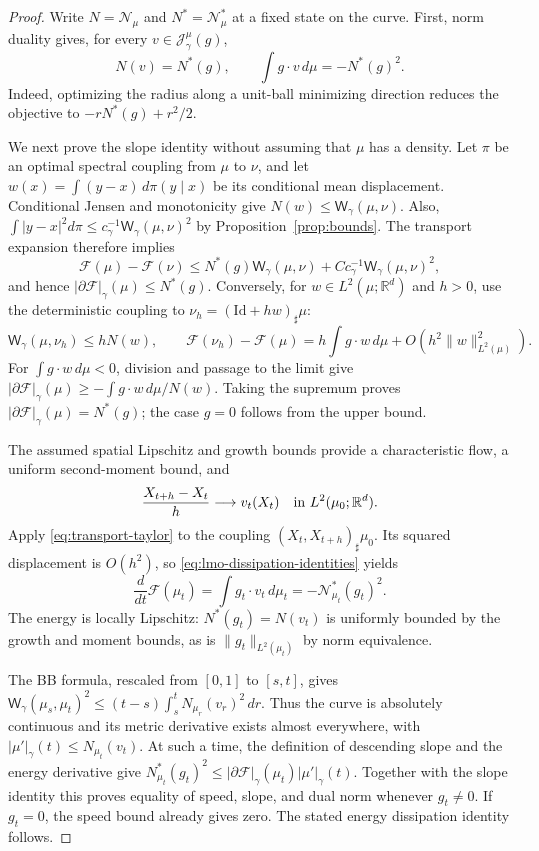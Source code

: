 \documentclass{article}
\newcommand{\R}{\mathbb{R}}
\newcommand{\MF}{\mathcal{F}}
\newcommand{\MN}{\mathcal{N}}
\newcommand{\MJ}{\mathcal{J}}
\newcommand{\Wg}{\mathsf{W}_{\gamma}}
\newcommand{\Id}{\mathrm{Id}}
\begin{document}
\begin{proof}
Write $N=\MN_\mu$ and $N^*=\MN_\mu^*$ at a fixed state on the curve.
First, norm duality gives, for every $v\in\MJ_\gamma^\mu(g)$,
\begin{equation}\label{eq:lmo-dissipation-identities}
 N(v)=N^*(g),\qquad \int g\cdot v\,d\mu=-N^*(g)^2.
\end{equation}
Indeed, optimizing the radius along a unit-ball minimizing direction reduces
the objective to $-rN^*(g)+r^2/2$.

We next prove the slope identity without assuming that $\mu$ has a density.
Let $\pi$ be an optimal spectral coupling from $\mu$ to $\nu$, and let
$w(x)=\int(y-x)\,d\pi(y\mid x)$ be its conditional mean displacement.
Conditional Jensen and monotonicity give
$N(w)\le\Wg(\mu,\nu)$. Also,
$\int|y-x|^2d\pi\le c_\gamma^{-1}\Wg(\mu,\nu)^2$ by
Proposition~\ref{prop:bounds}. The transport expansion therefore implies
\[
 \MF(\mu)-\MF(\nu)
 \le N^*(g)\Wg(\mu,\nu)+C c_\gamma^{-1}\Wg(\mu,\nu)^2,
\]
and hence $|\partial\MF|_\gamma(\mu)\le N^*(g)$.
Conversely, for $w\in L^2(\mu;\R^d)$ and $h>0$, use the deterministic
coupling to $\nu_h=(\Id+hw)_\sharp\mu$:
\[
 \Wg(\mu,\nu_h)\le hN(w),\qquad
 \MF(\nu_h)-\MF(\mu)=h\int g\cdot w\,d\mu+O(h^2\|w\|_{L^2(\mu)}^2).
\]
For $\int g\cdot w\,d\mu<0$, division and passage to the limit give
$|\partial\MF|_\gamma(\mu)\ge-\int g\cdot w\,d\mu/N(w)$.
Taking the supremum proves $|\partial\MF|_\gamma(\mu)=N^*(g)$; the case
$g=0$ follows from the upper bound.

The assumed spatial Lipschitz and growth bounds provide a characteristic
flow, a uniform second-moment bound, and
\[
 \frac{X_{t+h}-X_t}{h}\longrightarrow v_t(X_t)
 \quad\hbox{in }L^2(\mu_0;\R^d).
\]
Apply \eqref{eq:transport-taylor} to the coupling
$(X_t,X_{t+h})_\sharp\mu_0$. Its squared displacement is $O(h^2)$, so
\eqref{eq:lmo-dissipation-identities} yields
\[
 \frac{d}{dt}\MF(\mu_t)=\int g_t\cdot v_t\,d\mu_t
 =-\MN_{\mu_t}^*(g_t)^2.
\]
The energy is locally Lipschitz: $N^*(g_t)=N(v_t)$ is uniformly bounded by
the growth and moment bounds, as is $\|g_t\|_{L^2(\mu_t)}$ by norm equivalence.

The BB formula, rescaled from $[0,1]$ to $[s,t]$, gives
$\Wg(\mu_s,\mu_t)^2\le(t-s)\int_s^t N_{\mu_r}(v_r)^2\,dr$.
Thus the curve is absolutely continuous and its metric derivative exists
almost everywhere, with $|\mu'|_\gamma(t)\le N_{\mu_t}(v_t)$.
At such a time, the definition of descending slope and the energy derivative
give
$N_{\mu_t}^*(g_t)^2\le
|\partial\MF|_\gamma(\mu_t)|\mu'|_\gamma(t)$.
Together with the slope identity this proves equality of speed, slope, and
dual norm whenever $g_t\ne0$. If $g_t=0$, the speed bound already gives zero.
The stated energy dissipation identity follows.
\end{proof}
\end{document}
